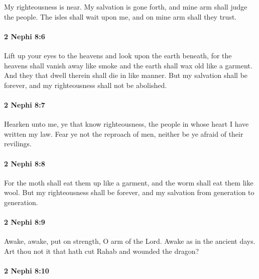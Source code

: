			My righteousness is near.
			My salvation is gone forth,
			and mine arm shall judge the people.
			The isles shall wait upon me,
			and on mine arm shall they trust.

		\paragraph{2 Nephi 8:6} %
			\label{2NEPHI-8-6}

			Lift up your eyes to the heavens
			and look upon the earth beneath,
			for the heavens shall vanish away like smoke
			and the earth shall wax old like a garment.
			And they that dwell therein shall die in like manner.
			But my salvation shall be forever,
			and my righteousness shall not be abolished.

		\paragraph{2 Nephi 8:7} %
			\label{2NEPHI-8-7}

			Hearken unto me, ye that know righteousness,
			the people in whose heart I have written my law.
			Fear ye not the reproach of men,
			neither be ye afraid of their revilings.

		\paragraph{2 Nephi 8:8} %
			\label{2NEPHI-8-8}

			For the moth shall eat them up like a garment,
			and the worm shall eat them like wool.
			But my righteousness shall be forever,
			and my salvation from generation to generation.

		\paragraph{2 Nephi 8:9} %
			\label{2NEPHI-8-9}

			Awake, awake, put on strength, O arm of the Lord.
			Awake as in the ancient days.
			Art thou not it that hath cut Rahab and wounded the dragon?

		\paragraph{2 Nephi 8:10} %
			\label{2NEPHI-8-10}

